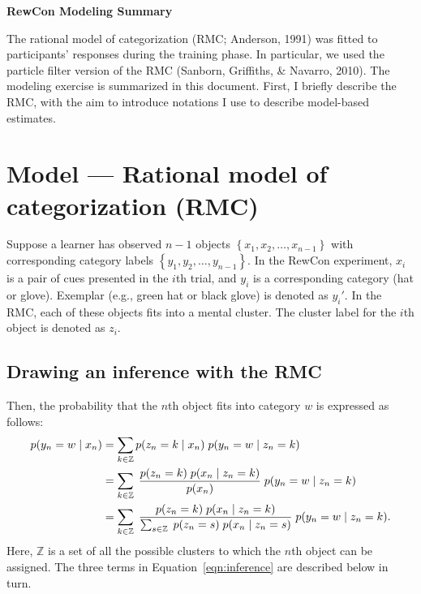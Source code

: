 \documentclass[11pt,a4paper]{article}
\begin{document}
{\let\thefootnote\relax{}}

\begin{center}
    \textbf{\LARGE RewCon Modeling Summary}
\end{center}

The rational model of categorization (RMC\@; Anderson, 1991) was fitted to participants' responses
during the training phase. In particular, we used the particle filter version of the RMC (Sanborn,
Griffiths, \& Navarro, 2010). The modeling exercise is summarized in this document. First, I briefly
describe the RMC, with the aim to introduce notations I use to describe model-based estimates.


\section{Model --- Rational model of categorization (RMC)}

Suppose a learner has observed $n - 1$ objects $\left\{x_{1}, x_{2}, \dots, x_{n - 1}\right\}$ with
corresponding category labels $\left\{y_{1}, y_{2}, \dots, y_{n - 1}\right\}$. In the RewCon
experiment, $x_{i}$ is a pair of cues presented in the $i$th trial, and $y_{i}$ is a corresponding
category (hat or glove).  Exemplar (e.g., green hat or black glove) is denoted as $y_{i}'$. In the
RMC, each of these objects fits into a mental cluster. The cluster label for the $i$th object is
denoted as $z_{i}$.

\subsection{Drawing an inference with the RMC}

Then, the probability that the $n$th object fits into category $w$ is expressed as follows:
\begin{align}
    p(y_{n} = w \; \vert \; x_{n})
    &= \sum_{k \in \mathbb{Z}} p(z_{n} = k \; \vert \; x_{n}) \; p(y_{n} = w \; \vert \; z_{n} = k) \notag\\
    &= \sum_{k \in \mathbb{Z}} \; \frac{p(z_{n} = k) \; p(x_{n} \;\vert\; z_{n} = k)}{p(x_{n})} \; p(y_{n} = w \; \vert \; z_{n} =
    k) \notag\\
    &= \sum_{k \in \mathbb{Z}} \; \frac{p(z_{n} = k) \; p(x_{n} \;\vert\; z_{n} = k)}{\sum_{s \in
    \mathbb{Z}} \; p(z_{n} = s) \; p(x_{n} \;\vert\; z_{n} = s)} \; p(y_{n} = w \; \vert \; z_{n} = k).
\label{eqn:inference}
\end{align}
Here, $\mathbb{Z}$ is a set of all the possible clusters to which the $n$th object can be assigned.
The three terms in Equation~\ref{eqn:inference} are described below in turn.
\end{document}
